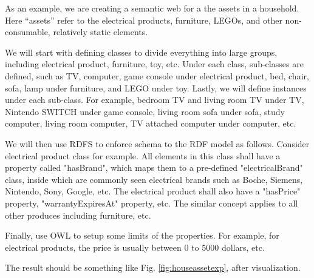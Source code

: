 As an example, we are creating a semantic web for a the assets in a household. Here ``assets'' refer to the electrical products, furniture, LEGOs, and other non-consumable, relatively static elements. 

We will start with defining classes to divide everything into large groups, including electrical product, furniture, toy, etc. Under each class, sub-classes are defined, such as TV, computer, game console under electrical product, bed, chair, sofa, lamp under furniture, and LEGO under toy. Lastly, we will define instances under each sub-class. For example, bedroom TV and living room TV under TV, Nintendo SWITCH under game console, living room sofa under sofa, study computer, living room computer, TV attached computer under computer, etc.

We will then use RDFS to enforce schema to the RDF model as follows. Consider electrical product class for example. All elements in this class shall have a property called "hasBrand", which maps them to a pre-defined "electricalBrand" class, inside which are commonly seen electrical brands such as Boche, Siemens, Nintendo, Sony, Google, etc. The electrical product shall also have a "hasPrice" property, "warrantyExpiresAt" property, etc. The similar concept applies to all other produces including furniture, etc.

Finally, use OWL to setup some limits of the properties. For example, for electrical products, the price is usually between 0 to 5000 dollars, etc.

The result should be something like Fig. \ref{fig:houseassetexp}, after visualization.

